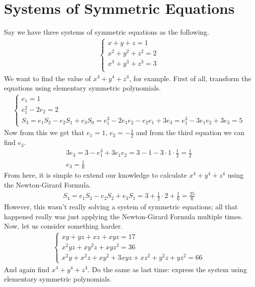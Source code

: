 \documentclass{article}
\begin{document}
\section{Systems of Symmetric Equations}

Say we have three systems of symmetric equations as the following.
\begin{gather*}
	\begin{cases}
		x + y + z = 1 \\
		x^2 + y^2 + z^2 = 2 \\
		x^3 + y^3 + z^3 = 3 \\
    	\end{cases}
\end{gather*}
We want to find the value of \(x^4 + y^4 + z^4\), for example. First of all, transform the equations using elementary symmetric polynomials.
\begin{gather*}
	\begin{cases}
		e_1 = 1 \\
		e_1^2 - 2e_2 = 2 \\
		S_3 = e_1 S_2 - e_2 S_1 + e_3 S_0 = e_1^3 - 2 e_1 e_2 - e_2 e_1 + 3 e_3 = e_1^3 - 3 e_1 e_2 + 3 e_3 = 5
	\end{cases}
\end{gather*}
Now from this we get that \(e_1 = 1\), \(e_2 =  -\frac{1}{2}\) and from the third equation we can find \(e_3\).
\begin{gather*}
	3e_3 = 3 - e_1^3 + 3 e_1 e_2 = 3 - 1 - 3 \cdot 1 \cdot \frac{1}{2} = \frac{1}{2} \\
	e_3 = \frac{1}{6}
\end{gather*}
From here, it is simple to extend our knowledge to calculate \(x^4 + y^4 + z^4\) using the Newton-Girard Formula.
\begin{gather*}
	S_4 = e_1 S_3 - e_2 S_2 + e_3 S_1 = 3 + \frac{1}{2} \cdot 2 + \frac{1}{6} = \frac{25}{6}
\end{gather*}
However, this wasn't really solving a system of symmetric equations; all that happened really was just applying the Newton-Girard Formula multiple times. Now, let us consider something harder.
\begin{gather*}
	\begin{cases}
		xy + yz + xz + xyz = 17 \\
		x^2 yz + x y^2z + xyz^2 = 36 \\
		x^2 y + x^2 z + x y^2 + 3 x y z + x z^2 + y^2 z + y z^2 = 66
	\end{cases}
\end{gather*}
And again find \(x^4 + y^4 + z^4\). Do the same as last time: express the system using elementary symmetric polynomials.
\end{document}
